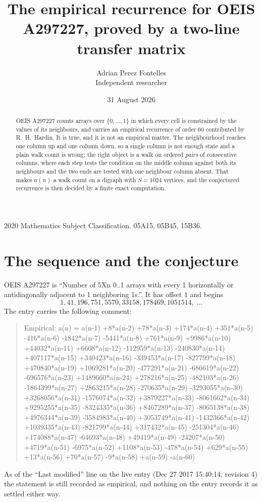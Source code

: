 \documentclass[11pt,a4paper]{article}
\title{The empirical recurrence for OEIS A297227, proved by a two-line transfer matrix}
\author{Adrian Perez Fontelles\\ \small Independent researcher}
\date{31 August 2026}
\theoremstyle{plain}
\theoremstyle{definition}
\begin{document}
\maketitle

\begin{abstract}
OEIS A297227 counts arrays over $\{0,\dots,1\}$ in which every cell is constrained by the
values of its neighbours, and carries an empirical recurrence of order $60$ contributed
by R.~H.~Hardin. It is true, and it is not an empirical matter. The neighbourhood reaches one
column up and one column down, so a single column is not enough state and a plain walk count
is wrong; the right object is a walk on ordered \emph{pairs} of consecutive columns, where
each step tests the condition on the middle column against both its neighbours and the two
ends are tested with one neighbour column absent. That makes $a(n)$ a walk count on a digraph
with $S=1024$ vertices, and the conjectured recurrence is then decided by a finite exact
computation.
\end{abstract}

\noindent\small 2020 Mathematics Subject Classification. 05A15, 05B45, 15B36.\normalsize

\section{The sequence and the conjecture}

OEIS A297227 is ``Number of 5Xn 0..1 arrays with every 1 horizontally or antidiagonally adjacent to 1 neighboring 1s.''. It has offset $1$ and begins
\[
1, 41, 196, 751, 5570, 33158, 178469, 1051514,\ \dots
\]
The entry carries the following comment:
\begin{quote}\small
Empirical: a(n) = a(n-1) +8*a(n-2) +78*a(n-3) +174*a(n-4) +351*a(n-5) -416*a(n-6) -1842*a(n-7) -5441*a(n-8) +761*a(n-9) +9986*a(n-10) +44032*a(n-11) +6608*a(n-12) -112959*a(n-13) -240830*a(n-14) +407117*a(n-15) +340423*a(n-16) -339453*a(n-17) -827799*a(n-18) +470840*a(n-19) +1069281*a(n-20) -477291*a(n-21) -686619*a(n-22) -696576*a(n-23) +1489660*a(n-24) +278216*a(n-25) -482103*a(n-26) -1864399*a(n-27) +2863215*a(n-28) -270635*a(n-29) -3293055*a(n-30) +3268056*a(n-31) -1576074*a(n-32) +3879227*a(n-33) -8061662*a(n-34) +9295255*a(n-35) -8324335*a(n-36) +8467289*a(n-37) -8065138*a(n-38) +4976344*a(n-39) -3584983*a(n-40) +3053749*a(n-41) -1432366*a(n-42) +1039335*a(n-43) -821799*a(n-44) +317432*a(n-45) -251304*a(n-46) +174088*a(n-47) -64693*a(n-48) +49419*a(n-49) -24207*a(n-50) +4719*a(n-51) -6975*a(n-52) +1108*a(n-53) -478*a(n-54) +629*a(n-55) +13*a(n-56) +70*a(n-57) -9*a(n-58) +a(n-59) -a(n-60)
\end{quote}
As of the ``Last modified'' line on the live entry (Dec 27 2017 15:40:14, revision 4) the statement is
still recorded as empirical, and nothing on the entry records it as settled either way.
\end{document}
